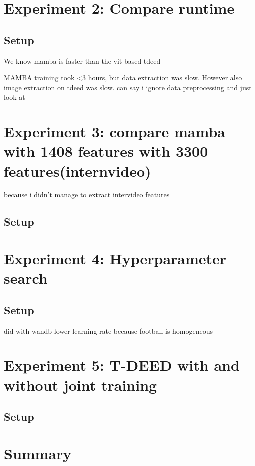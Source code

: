 \section{Experiment 2: Compare runtime}
\subsection{Setup}
\label{ssec:ex2_setup}

We know mamba is faster than the vit based tdeed

MAMBA training took <3 hours, but data extraction was slow. However also image extraction on tdeed was slow. can say i ignore data preprocessing and just look at 
\section{Experiment 3: compare mamba with 1408 features with 3300 features(internvideo)}
because i didn't manage to extract intervideo features
\subsection{Setup}
\label{ssec:ex3_setup}

\section{Experiment 4: Hyperparameter search}
\subsection{Setup}
\label{ssec:ex4_setup}

did with wandb
lower learning rate because football is homogeneous
\section{Experiment 5: T-DEED with and without joint training}
\subsection{Setup}
\label{ssec:ex5_setup}


\section{Summary}

